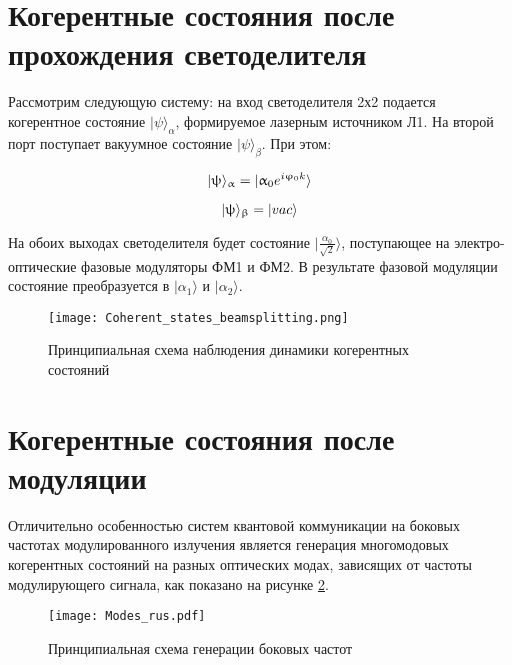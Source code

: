 \section{Когерентные состояния после прохождения светоделителя} \label{ch:ch4/sec4}
 
Рассмотрим следующую систему: на вход светоделителя 2х2 подается когерентное состояние $| \psi \rangle_{\alpha}$, формируемое лазерным источником Л1. На второй порт поступает вакуумное состояние $| \psi \rangle_{\beta}$. При этом:

\begin{equation}
	| \psi \rangle_{\alpha} = | \alpha_{0} e^{i\phi_{0}k} \rangle \\
\end{equation}

\begin{equation}
	| \psi \rangle_{\beta} = | vac \rangle \\
\end{equation}


На обоих выходах светоделителя будет состояние  $| \frac{\alpha_{0}}{\sqrt{2}} \rangle$, поступающее на электро-оптические фазовые модуляторы ФМ1 и ФМ2. В результате фазовой модуляции состояние преобразуется в $| \alpha_{1} \rangle$ и $| \alpha_{2} \rangle$. 


 \begin{figure}[ht]
  \centering
  \texttt{[image: Coherent\_states\_beamsplitting.png]}
  \caption{Принципиальная схема наблюдения динамики когерентных состояний}
  \label{fig:Coherent_states_beamsplitting}
\end{figure}

\pagebreak

\section{Когерентные состояния после модуляции} \label{ch:ch4/sec5}

Отличительно особенностью систем квантовой коммуникации на боковых частотах модулированного излучения является генерация многомодовых когерентных состояний на разных оптических модах, зависящих от частоты модулирующего сигнала, как показано на рисунке \ref{fig:multimodes_q}. 

 \begin{figure}[ht]
  \centering
  \texttt{[image: Modes\_rus.pdf]}
  \caption{Принципиальная схема генерации боковых частот}
  \label{fig:multimodes_q}
\end{figure}


